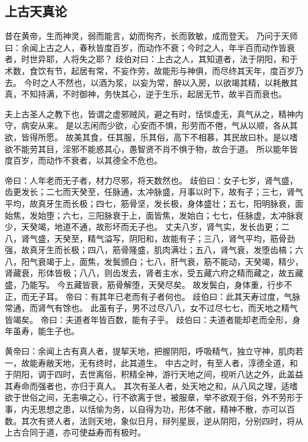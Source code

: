 \subsection{上古天真论}

昔在黄帝，生而神灵，弱而能言，幼而徇齐，长而敦敏，成而登天。
乃问于天师曰：余闻上古之人，春秋皆度百岁，而动作不衰；今时之人，年半百而动作皆衰者，时世异耶，人将失之耶？
歧伯对曰：上古之人，其知道者，法于阴阳，和于术数，食饮有节，起居有常，不妄作劳，故能形与神俱，而尽终其天年，度百岁乃去。
今时之人不然也，以酒为浆，以妄为常，醉以入房，以欲竭其精，以耗散其真，不知持满，不时御神，务快其心，逆于生乐，起居无节，故半百而衰也。

夫上古圣人之教下也，皆谓之虚邪贼风，避之有时，恬惔虚无，真气从之，精神内守，病安从来。
是以志闲而少欲，心安而不惧，形劳而不倦，气从以顺，各从其欲，皆得所愿。
故美其食，任其服，乐其俗，高下不相慕，其民故曰朴。是以嗜欲不能劳其目，淫邪不能惑其心，愚智贤不肖不惧于物，故合于道。
所以能年皆度百岁，而动作不衰者，以其德全不危也。

帝曰：人年老而无子者，材力尽邪，将天数然也。
歧伯曰：女子七岁，肾气盛，齿更发长；二七而天癸至，任脉通，太冲脉盛，月事以时下，故有子；三七，肾气平均，故真牙生而长极；四七，筋骨坚，发长极，身体盛壮；五七，阳明脉衰，面始焦，发始堕；六七，三阳脉衰于上，面皆焦，发始白；七七，任脉虚，太冲脉衰少，天癸竭，地道不通，故形坏而无子也。
丈夫八岁，肾气实，发长齿更；二八，肾气盛，天癸至，精气溢写，阴阳和，故能有子；三八，肾气平均，筋骨劲强，故真牙生而长极；四八，筋骨隆盛，肌肉满壮；五八，肾气衰，发堕齿槁；六八，阳气衰竭于上，面焦，发鬓颁白；七八，肝气衰，筋不能动，天癸竭，精少，肾藏衰，形体皆极；八八，则齿发去，肾者主水，受五藏六府之精而藏之，故五藏盛，乃能写。
今五藏皆衰，筋骨解堕，天癸尽矣。
故发鬓白，身体重，行步不正，而无子耳。
帝曰：有其年已老而有子者何也。
歧伯曰：此其天寿过度，气脉常通，而肾气有馀也。
此虽有子，男不过尽八八，女不过尽七七，而天地之精气皆竭矣。
帝曰：夫道者年皆百数，能有子乎。
歧伯曰：夫道者能却老而全形，身年虽寿，能生子也。

黄帝曰：余闻上古有真人者，提挈天地，把握阴阳，呼吸精气，独立守神，肌肉若一，故能寿敝天地，无有终时，此其道生。
中古之时，有至人者，淳德全道，和于阴阳，调于四时，去世离俗，积精全神，游行天地之间，视听八达之外，此盖益其寿命而强者也，亦归于真人。
其次有圣人者，处天地之和，从八风之理，适嗜欲于世俗之间，无恚嗔之心，行不欲离于世，被服章，举不欲观于俗，外不劳形于事，内无思想之患，以恬愉为务，以自得为功，形体不敝，精神不散，亦可以百数。其次有贤人者，法则天地，象似日月，辩列星辰，逆从阴阳，分别四时，将从上古合同于道，亦可使益寿而有极时。

